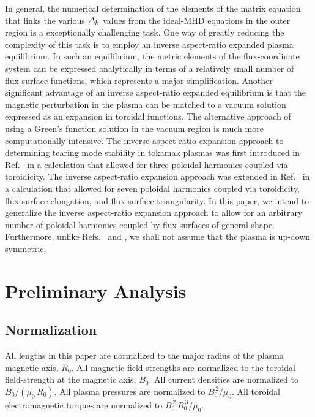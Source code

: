 \documentclass[12pt,prb,aps]{revtex4-1}
\begin{document}
In general, the  numerical determination of the elements of the matrix equation that links the various ${\mit\Delta}_k$ values from the ideal-MHD equations 
in the outer region is a exceptionally challenging task.\cite{nish,pletz,am2,aglas,aglas1}
One way of greatly reducing the complexity of this task is to employ an inverse aspect-ratio expanded plasma equilibrium.\cite{greene} In such an equilibrium,
the metric elements of the flux-coordinate system can be expressed analytically in terms of a relatively small number of  flux-surface functions,
which represents a major simplification.\cite{con0} Another significant advantage of an inverse aspect-ratio expanded equilibrium is that the magnetic perturbation in the plasma can be
matched to a vacuum solution  expressed as an expansion in toroidal functions.\cite{am1} The alternative approach of using a Green's
function solution in the vacuum region is much more computationally intensive.\cite{chance} The inverse aspect-ratio expansion approach to determining tearing mode stability in tokamak plasmas 
was first introduced in Ref.~ in a calculation that allowed for three  poloidal harmonics coupled via toroidicity. The
inverse aspect-ratio expansion approach was extended in Ref.~ in a calculation that allowed for seven poloidal harmonics coupled via toroidicity, flux-surface elongation, and
flux-surface triangularity. In this paper, we intend to generalize the inverse aspect-ratio expansion  approach to allow for an arbitrary number of poloidal harmonics coupled
by flux-surfaces of general shape. Furthermore, unlike Refs.~ and , we shall not assume that the plasma
is up-down symmetric. 

\section{Preliminary Analysis}
\subsection{Normalization}\label{coords}
All lengths in this paper are normalized to  the major radius of the plasma magnetic axis, $R_0$. All magnetic field-strengths
are normalized to the  toroidal field-strength at the magnetic axis, $B_0$. All current densities are normalized to $B_0/(\mu_0\,R_0)$. All plasma pressures are normalized to $B_0^{\,2}/\mu_0$.
All toroidal electromagnetic torques are normalized to $B_0^{\,2}\,R_0^{\,3}/\mu_0$. 
\end{document}

